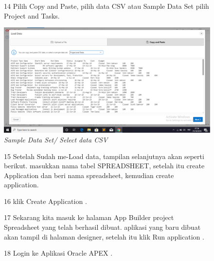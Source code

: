 \begin{enumerate}
\begin{figure}
\item[14] Pilih Copy and Paste, pilih data CSV atau Sample Data Set pilih Project and Tasks.

    \begin{center}
\includegraphics[scale=0.2]{apex/apex7.png}
    \caption{\textit{Sample Data Set/ Select data CSV}}
        \end{center}
\label{gambar}
\end{figure}

\begin{figure}
\item[15] Setelah Sudah me-Load data, tampilan selanjutnya akan seperti berikut. masukkan nama tabel {SPREADSHEET}, setelah itu create Application dan beri nama spreadsheet, kemudian create application.

\end{figure}

\begin{figure}
\item[16] klik Create Application .

\end{figure}


\begin{figure}
\item[17]Sekarang kita masuk ke halaman App Builder project Spreadsheet yang telah berhasil dibuat. aplikasi yang baru dibuat akan tampil di halaman designer, setelah itu klik Run application .
\end{figure}

\begin{figure}
\item[18]Login ke Aplikasi Oracle APEX .


\end{figure}
\end{enumerate}
